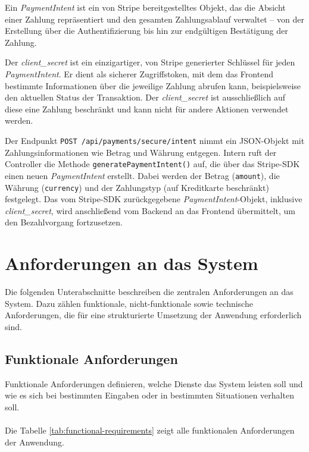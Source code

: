 \noindent Ein \textit{PaymentIntent} ist ein von Stripe bereitgestelltes Objekt, das die Absicht einer Zahlung repräsentiert und den gesamten Zahlungsablauf verwaltet – von der Erstellung über die Authentifizierung bis hin zur endgültigen Bestätigung der Zahlung.

\noindent Der \textit{client\_secret} ist ein einzigartiger, von Stripe generierter Schlüssel für jeden \textit{PaymentIntent}. Er dient als sicherer Zugriffstoken, mit dem das Frontend bestimmte Informationen über die jeweilige Zahlung abrufen kann, beispielsweise den aktuellen Status der Transaktion. Der \textit{client\_secret} ist ausschließlich auf diese eine Zahlung beschränkt und kann nicht für andere Aktionen verwendet werden. 

\noindent Der Endpunkt \texttt{POST /api/payments/secure/intent} nimmt ein JSON-Objekt mit Zahlungsinformationen wie Betrag und Währung entgegen. Intern ruft der Controller die Methode \texttt{generatePaymentIntent()} auf, die über das Stripe-SDK einen neuen \textit{PaymentIntent} erstellt. Dabei werden der Betrag (\texttt{amount}), die Währung (\texttt{currency}) und der Zahlungstyp (auf Kreditkarte beschränkt) festgelegt. Das vom Stripe-SDK zurückgegebene \textit{PaymentIntent}-Objekt, inklusive \textit{client\_secret}, wird anschließend vom Backend an das Frontend übermittelt, um den Bezahlvorgang fortzusetzen.

\section{Anforderungen an das System}

Die folgenden Unterabschnitte beschreiben die zentralen Anforderungen an das System. Dazu zählen funktionale, nicht-funktionale sowie technische Anforderungen, die für eine strukturierte Umsetzung der Anwendung erforderlich sind.

\subsection{Funktionale Anforderungen}


Funktionale Anforderungen definieren, welche Dienste das System leisten soll und wie es sich bei bestimmten Eingaben oder in bestimmten Situationen verhalten soll.\\ \\
Die Tabelle \ref{tab:functional-requirements} zeigt alle funktionalen Anforderungen der Anwendung.


